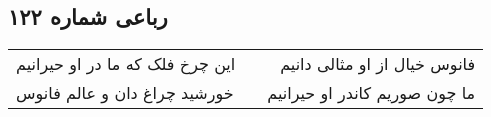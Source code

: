 \begin{center}
\section*{رباعی شماره ۱۲۲}
\label{sec:sh122}
\begin{longtable}{l p{0.5cm} r}
این چرخ فلک که ما در او حیرانیم
&&
فانوس خیال از او مثالی دانیم
\\
خورشید چراغ دان و عالم فانوس
&&
ما چون صوریم کاندر او حیرانیم
\\
\end{longtable}
\end{center}
